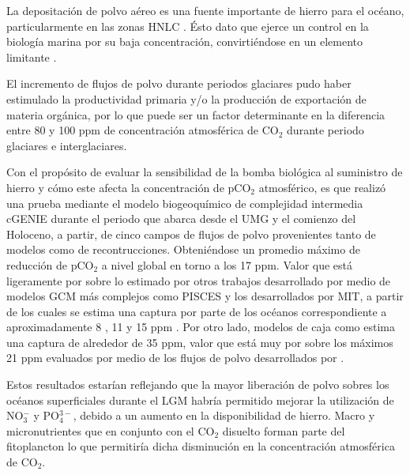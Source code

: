 

La depositación de polvo aéreo es una fuente importante de hierro para el oc\'eano, particularmente en las zonas HNLC \citep{jin2008impact,martinez2014iron,lambert2015dust}. \'Esto dato que ejerce un control en la biología marina por su baja concentración, convirtiéndose en un elemento limitante \citep{falkowski1998biogeochemical,martin1990glacial,gruber2008marine,tagliabue2017integral}.

El incremento de flujos de polvo durante periodos glaciares \citep{mahowald1999dust,gaspari2006atmospheric,lambert2008dust,maher2010global,lamy2014increased} pudo haber estimulado la productividad primaria y/o la producción de exportación de materia orgánica, por lo que puede ser un factor determinante en la diferencia entre 80 y 100 ppm \citep{sigman2000glacial,hain2010carbon,ferrari2014antarctic} de concentración atmosférica de CO$_2$ durante periodo glaciares e interglaciares.

Con el propósito de evaluar la sensibilidad de la bomba biológica al suministro de hierro y cómo este afecta la concentración de pCO$_2$ atmosférico, es que realizó una prueba mediante el modelo biogeoquímico de complejidad intermedia cGENIE durante el periodo que abarca desde el UMG y el comienzo del Holoceno, a partir, de cinco campos de flujos de polvo \citep{lambert2015dust,yukimoto2012new,sueyoshi2013set,takemura2009simulation,albani2014improved} provenientes tanto de modelos como de recontrucciones. Obteniéndose un promedio máximo de reducción de pCO$_2$ a nivel global en torno a los 17 ppm. Valor que está ligeramente por sobre lo estimado por otros trabajos desarrollado por medio de modelos GCM más complejos como PISCES y los desarrollados por MIT, a partir de los cuales se estima una captura por parte de los océanos correspondiente a aproximadamente 8 \citep{parekh2006atmospheric,lambert2015dust}, 11 \citep{tagliabue2009quantifying} y 15 ppm \citep{bopp2003dust}. Por otro lado, modelos de caja como \cite{hain2010carbon} estima una captura de alrededor de 35 ppm, valor que está muy por sobre los máximos 21 ppm evaluados por medio de los flujos de polvo desarrollados por \cite{albani2014improved}. 

Estos resultados estarían reflejando que la mayor liberación de polvo sobres los océanos superficiales durante el LGM habría permitido mejorar la utilización de NO$_{3}^{-}$ y PO$_{4}^{3-}$, debido a un aumento en la disponibilidad de hierro. Macro y micronutrientes que en conjunto con el CO$_2$ disuelto forman parte del fitoplancton lo que permitiría dicha disminución en la concentración atmosférica de CO$_2$.

